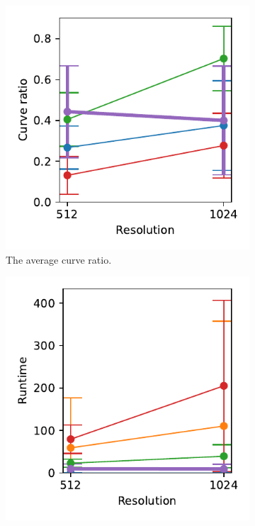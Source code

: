 \begin{figure}[!h]
\begin{subfigure}{.3\textwidth}
    \includegraphics[width=\textwidth]{graphics/eval/curve ratio_1024-1.024_True_tonari.pdf}
    \caption{The average curve ratio.}
\end{subfigure}
    \begin{subfigure}{.3\textwidth}
    \centering
    \includegraphics[width=\textwidth]{graphics/eval/runtime_1024-1.024_True_tonari.pdf}

\end{subfigure}
\end{figure}
